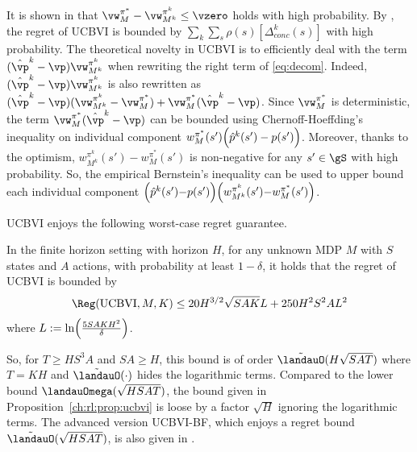 It is shown in \cite{azar2017minimax} that $\vw^{\pi^*}_M- \vw^{\pi^k}_{M^k}\le \vzero$ holds with high probability.
By , the regret of UCBVI is bounded by ${\sum_{k}\sum_{s}\rho(s)[\Delta_{conc}^k(s)]}$ with high probability.
The theoretical novelty in UCBVI is to efficiently deal with the term $(\hat{\vp}^k-\vp)\vw^{\pi^k}_{M^k}$ when rewriting the right term of \eqref{eq:decom}. %
Indeed, $(\hat{\vp}^k-\vp)\vw^{\pi^k}_{M^k}$ is also rewritten as $(\hat{\vp}^k-\vp)(\vw^{\pi^k}_{M^k}-\vw^{\pi^*}_{M}) +\vw^{\pi^*}_{M}(\hat{\vp}^k-\vp)$.
Since $\vw^{\pi^*}_M$ is deterministic, the term $\vw^{\pi^*}_{M}(\hat{\vp}^k-\vp)$ can be bounded using Chernoff-Hoeffding's inequality on individual component $w^{\pi^*}_{M}(s')\Bigl(\hat{p}^k(s')-p(s')\Bigr)$.
Moreover, thanks to the optimism, $w^{\pi^k}_{M^k}(s')-w^{\pi^*}_{M}(s')$ is non-negative for any $s'\in\gS$ with high probability.
So, the empirical Bernstein's inequality can be used to upper bound each individual component $\Bigl(\hat{p}^k(s'){-}p(s')\Bigr)\Bigl(w^{\pi^k}_{M^k}(s'){-}w^{\pi^*}_{M}(s')\Bigr)$.

UCBVI enjoys the following worst-case regret guarantee.
\begin{prop}
    \label{ch:rl:prop:ucbvi}
    In the finite horizon setting with horizon $H$, for any unknown MDP $M$ with $S$ states and $A$ actions,
    with probability at least $1-\delta$, it holds that the regret of UCBVI is bounded by
    \begin{align*}
        \Reg(\textnormal{UCBVI}, M, K) \le 20H^{3/2}\sqrt{SAK}L +250H^2S^2AL^2
    \end{align*}
    where $L:=\ln\Bigl(\frac{5SAKH^2}{\delta}\Bigr)$.
\end{prop}
So, for $T\ge HS^3A$ and $SA\ge H$, this bound is of order $\tilde{\landauO}(H\sqrt{SAT})$ where $T=KH$ and $\tilde{\landauO}(\cdot)$ hides the logarithmic terms.
Compared to the lower bound $\landauOmega(\sqrt{HSAT})$, the bound given in Proposition~\ref{ch:rl:prop:ucbvi} is loose by a factor $\sqrt{H}$ ignoring the logarithmic terms.
The advanced version UCBVI-BF, which enjoys a regret bound $\tilde{\landauO}(\sqrt{HSAT})$, is also given in \cite{azar2017minimax}.%

